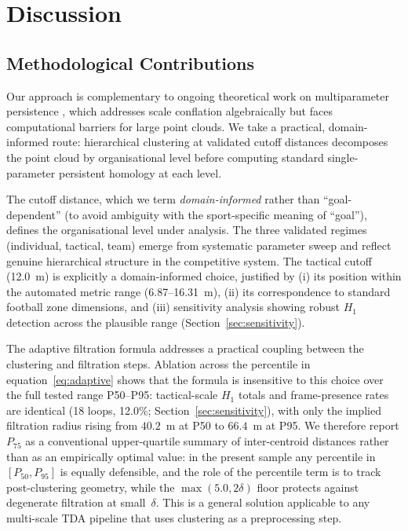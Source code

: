 \section{Discussion}
\label{sec:discussion}

\subsection{Methodological Contributions}

Our approach is complementary to ongoing theoretical work on multiparameter persistence \citep{BotnanLesnick2022}, which addresses scale conflation algebraically but faces computational barriers for large point clouds. We take a practical, domain-informed route: hierarchical clustering at validated cutoff distances decomposes the point cloud by organisational level before computing standard single-parameter persistent homology at each level.

The cutoff distance, which we term \emph{domain-informed} rather than ``goal-dependent'' (to avoid ambiguity with the sport-specific meaning of ``goal''), defines the organisational level under analysis. The three validated regimes (individual, tactical, team) emerge from systematic parameter sweep and reflect genuine hierarchical structure in the competitive system. The tactical cutoff (12.0~m) is explicitly a domain-informed choice, justified by (i) its position within the automated metric range (6.87--16.31~m), (ii) its correspondence to standard football zone dimensions, and (iii) sensitivity analysis showing robust \(H_1\) detection across the plausible range (Section~\ref{sec:sensitivity}).

The adaptive filtration formula addresses a practical coupling between the clustering and filtration steps. Ablation across the percentile in equation~\eqref{eq:adaptive} shows that the formula is insensitive to this choice over the full tested range P50--P95: tactical-scale \(H_1\) totals and frame-presence rates are identical (18 loops, 12.0\%; Section~\ref{sec:sensitivity}), with only the implied filtration radius rising from \(40.2\)~m at P50 to \(66.4\)~m at P95. We therefore report \(P_{75}\) as a conventional upper-quartile summary of inter-centroid distances rather than as an empirically optimal value: in the present sample any percentile in \([P_{50}, P_{95}]\) is equally defensible, and the role of the percentile term is to track post-clustering geometry, while the \(\max(5.0, 2\delta)\) floor protects against degenerate filtration at small~\(\delta\). This is a general solution applicable to any multi-scale TDA pipeline that uses clustering as a preprocessing step.

